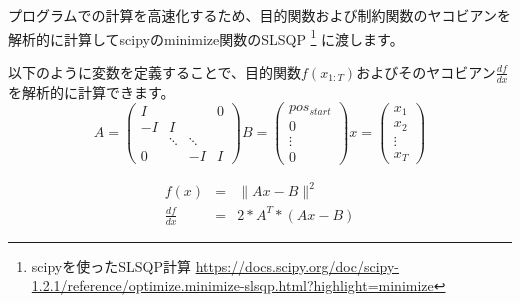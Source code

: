 プログラムでの計算を高速化するため、目的関数および制約関数のヤコビアンを解析的に計算してscipyのminimize関数のSLSQP
\footnote{scipyを使ったSLSQP計算 \url{https://docs.scipy.org/doc/scipy-1.2.1/reference/optimize.minimize-slsqp.html?highlight=minimize}}
に渡します。

以下のように変数を定義することで、目的関数$f(x_{1:T})$およびそのヤコビアン$\displaystyle \frac{df}{dx}$を解析的に計算できます。
\begin{equation*}
  A =
  \begin{pmatrix}
    I      &        &        & 0      \\
    -I     & I      &        &        \\
           & \ddots & \ddots &        \\
    0      &        & -I     & I
  \end{pmatrix}
  B =
  \begin{pmatrix}
    pos_{start} \\
    0           \\
    \vdots      \\
    0
  \end{pmatrix}
  x =
  \begin{pmatrix}
    x_1    \\
    x_2    \\
    \vdots \\
    x_T
  \end{pmatrix}
\end{equation*}

\begin{eqnarray*}
  f(x) &=& \|Ax - B\|^2 \\
  \frac{df}{dx} &=& 2 * A^T *(Ax - B)
\end{eqnarray*}

